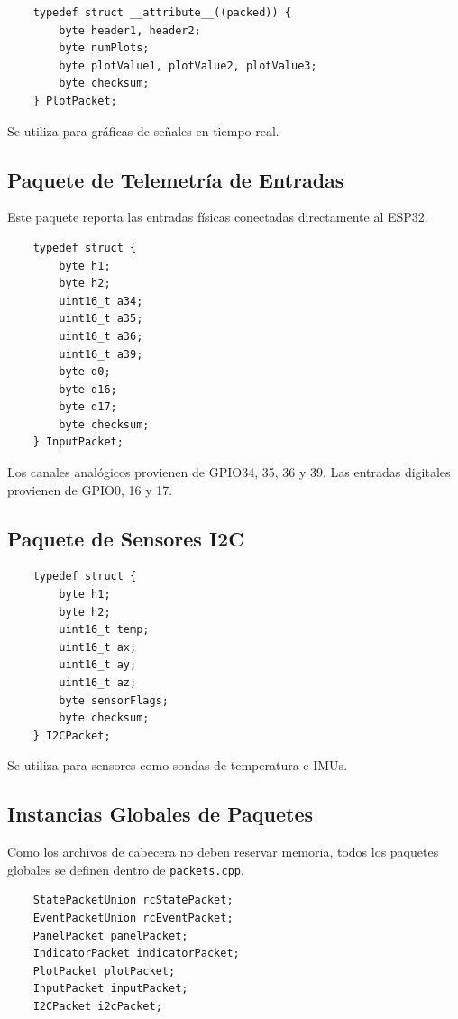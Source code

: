 \documentclass[12pt,a4paper]{article}
\newcommand{\ardfnDG}[1]{\texttt{\textcolor{arduinoTeal}{#1}}}
\begin{document}
\begin{lstlisting}
	typedef struct __attribute__((packed)) {
		byte header1, header2;
		byte numPlots;
		byte plotValue1, plotValue2, plotValue3;
		byte checksum;
	} PlotPacket;
\end{lstlisting}

Se utiliza para gráficas de señales en tiempo real.

\subsection{Paquete de Telemetría de Entradas}

Este paquete reporta las entradas físicas conectadas directamente al ESP32.

\begin{lstlisting}
	typedef struct {
		byte h1;
		byte h2;
		uint16_t a34;
		uint16_t a35;
		uint16_t a36;
		uint16_t a39;
		byte d0;
		byte d16;
		byte d17;
		byte checksum;
	} InputPacket;
\end{lstlisting}

Los canales analógicos provienen de GPIO34, 35, 36 y 39.  
Las entradas digitales provienen de GPIO0, 16 y 17.

\subsection{Paquete de Sensores I2C}

\begin{lstlisting}
	typedef struct {
		byte h1;
		byte h2;
		uint16_t temp;
		uint16_t ax;
		uint16_t ay;
		uint16_t az;
		byte sensorFlags;
		byte checksum;
	} I2CPacket;
\end{lstlisting}

Se utiliza para sensores como sondas de temperatura e IMUs.

\subsection{Instancias Globales de Paquetes}

Como los archivos de cabecera no deben reservar memoria, todos los paquetes
globales se definen dentro de \ardfnDG{packets.cpp}.

\begin{lstlisting}
	StatePacketUnion rcStatePacket;
	EventPacketUnion rcEventPacket;
	PanelPacket panelPacket;
	IndicatorPacket indicatorPacket;
	PlotPacket plotPacket;
	InputPacket inputPacket;
	I2CPacket i2cPacket;
\end{lstlisting}
\end{document}
